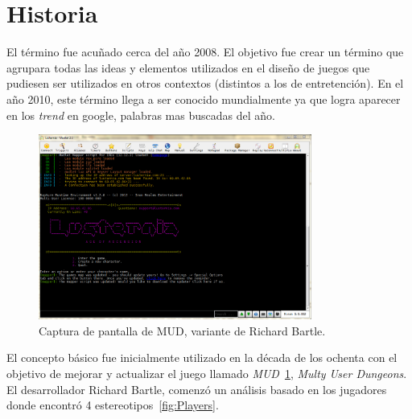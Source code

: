 \section{Historia}

El término {\GAM} fue acuñado cerca del año 2008\cite{DefineGamefication}.
El objetivo fue crear un término que agrupara todas las ideas y elementos
utilizados en el diseño de juegos que pudiesen ser utilizados en otros contextos
(distintos a los de entretención).
En el año 2010, este término llega a ser conocido mundialmente ya que logra
aparecer en los \emph{trend} en google\cite{LiCap1.3}, palabras mas buscadas
del año.

\begin{figure}[!htb]
  \centering
  \includegraphics[width=0.8\textwidth]{images/mudclient.png}
  \caption[Captura de pantalla de juego MUD]{Captura de pantalla de MUD,
  variante de Richard Bartle.}
  \label{fig:MudClient}
\end{figure}

El concepto básico fue inicialmente utilizado en la década de los ochenta con el
objetivo de mejorar y actualizar el juego llamado \emph{MUD}~\ref{fig:MudClient},
\emph{Multy User Dungeons}.
El desarrollador Richard Bartle, comenzó un análisis basado en los jugadores
donde encontró 4 estereotipos~\ref{fig:Players}.

